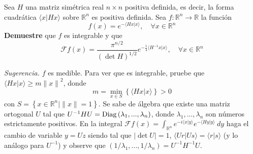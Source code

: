 \documentclass[12pt]{report}
\theoremstyle{largebreak}
\renewcommand{\geq}{\ensuremath{\geqslant}}
\newcommand\abs[1]{\ensuremath{\left|#1\right|}}
\newcommand\cf[3]{\ensuremath{#1:#2\rightarrow#3}}
\newcommand\norm[1]{\ensuremath{\|#1\|}}
\newcommand\pint[2]{\ensuremath{\langle#1| #2\rangle}}
\newcommand{\fou}[1]{\ensuremath{\mathcal{F}#1}}
\newcommand{\diag}[1]{\ensuremath{\left(#1\right)}}
\begin{document}
    \begin{excer}
        Sea $H$ una matriz simétrica real $n\times n$ positiva definida, es decir, la forma cuadrática $\pint{x}{Hx}$ sobre $\mathbb{R}^n$ es positiva definida. Sea $\cf{f}{\mathbb{R}^n}{\mathbb{R}}$ la función
        \begin{equation*}
            f(x)=e^{ -\pint{Hx}{x}},\quad\forall x\in\mathbb{R}^n
        \end{equation*}
        \textbf{Demuestre} que $f$ es integrable y que
        \begin{equation*}
            \fou{f}(x)=\frac{\pi^{ n/2}}{\left(\det H\right)^{ 1/2}}e^{ -\frac{1}{4}\pint{H^{-1}x}{x}},\quad\forall x\in\mathbb{R}^n
        \end{equation*}
        
        \textit{Sugerencia.} $f$ es medible. Para ver que es integrable, pruebe que $\pint{Hx}{x}\geq m\norm{x}^2$, donde
        \begin{equation*}
            m=\min_{ x\in S} \left\{\pint{Hx}{x} \right\}>0
        \end{equation*}
        con $S=\left\{x\in\mathbb{R}^n\Big|\norm{x}=1 \right\}$. Se sabe de álgebra que existe una matriz ortogonal $U$ tal que $U^{-1}HU=\textup{Diag}\left(\lambda_1,...,\lambda_n\right)$, donde $\lambda_1,...,\lambda_n$ son números estrictamente positivos. En la integral $\fou{f}(x)=\int_{\mathbb{R}^n}e^{ -i\pint{x}{y}}e^{ -\pint{Hy}{y}}\:dy$ haga el cambio de variable $y=Uz$ siendo tal que $\abs{\det U}=1$, $\pint{Ur}{Us}=\pint{r}{s}$ (y lo análogo para $U^{-1}$) y observe que $\diag{1/\lambda_1,...,1/\lambda_n}=U^{-1}H^{-1}U$.
    \end{excer}
\end{document}
